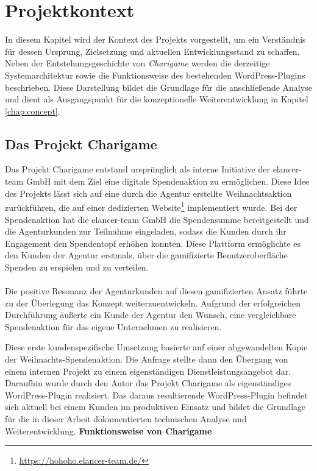 \chapter{Projektkontext}
\label{chap:context}
In diesem Kapitel wird der Kontext des Projekts vorgestellt, um ein Verständnis für dessen Ursprung, Zielsetzung und aktuellen Entwicklungsstand zu schaffen.
Neben der Entstehungsgeschichte von \textit{Charigame} werden die derzeitige Systemarchitektur sowie die Funktionsweise des bestehenden WordPress-Plugins beschrieben.
Diese Darstellung bildet die Grundlage für die anschließende Analyse und dient als Ausgangspunkt für die konzeptionelle Weiterentwicklung in Kapitel \ref{chap:concept}.
\section{Das Projekt Charigame}

Das Projekt Charigame entstand ursprünglich als interne Initiative der elancer-team GmbH mit dem Ziel eine digitale Spendenaktion zu ermöglichen.
Diese Idee des Projekts lässt sich auf eine durch die Agentur erstellte Weihnachtsaktion zurückführen, die auf einer dedizierten Website\footnote{\url{https://hohoho.elancer-team.de/}} implementiert wurde.
Bei der Spendenaktion hat die elancer-team GmbH die Spendensumme bereitgestellt und die Agenturkunden zur Teilnahme eingeladen, sodass die Kunden durch ihr Engagement den Spendentopf erhöhen konnten.
Diese Plattform ermöglichte es den Kunden der Agentur erstmals, über die gamifizierte Benutzeroberfläche Spenden zu erspielen und zu verteilen.
\\\\
Die positive Resonanz der Agenturkunden auf diesen gamifizierten Ansatz führte zu der Überlegung das Konzept weiterzuentwickeln.
Aufgrund der erfolgreichen Durchführung äußerte ein Kunde der Agentur den Wunsch, eine vergleichbare Spendenaktion für das eigene Unternehmen zu realisieren.

Diese erste kundenspezifische Umsetzung basierte auf einer abgewandelten Kopie der Weihnachts-Spendenaktion.
Die Anfrage stellte dann den Übergang von einem internen Projekt zu einem eigenständigen Dienstleistungsangebot dar.
Daraufhin wurde durch den Autor das Projekt Charigame als eigenständiges WordPress-Plugin realisiert.
Das daraus resultierende WordPress-Plugin befindet sich aktuell bei einem Kunden im produktiven Einsatz und bildet die Grundlage für die in dieser Arbeit dokumentierten technischen Analyse und Weiterentwicklung.
\newpage
\textbf{Funktionsweise von Charigame}

